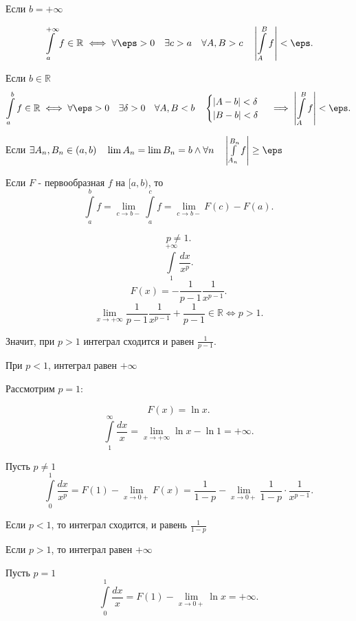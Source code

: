 \begin{remark} \thmslashn

    Если $b=+\infty$

    \[ \int\limits_{a}^{+\infty} f\in \mathbb{R} \iff \forall{\eps > 0}\quad \exists{c > a}\quad \forall{A, B > c}\quad \left| \int\limits_{A}^{B} f\right| < \eps    .\]

    Если $b\in \mathbb{R}$
    \[ \int\limits_{a}^{b} f\in \mathbb{R} \iff \forall{\eps > 0}\quad \exists{\delta > 0}\quad \forall{A, B < b}\quad \begin{cases}
        |A-b| < \delta\\
        |B-b| < \delta
    \end{cases} \implies \left| \int\limits_{A}^{B} f \right| < \eps  .\]

    Если $\exists{A_{n}, B_{n}\in (a, b)}\quad \lim A_n = \lim B_n = b \land \forall{n}\quad \left| \int\limits_{A_{n}}^{B_{n}} f\right| \ge \eps   $

    Если $F$ - первообразная $f$ на $[a, b)$, то 
    \[ \int\limits_{a}^{b} f = \lim\limits_{c \to b-} \int\limits_{a}^{c} f = \lim\limits_{c \to b-} F(c) - F(a)  .\] 
\end{remark}
\begin{example} \thmslashn
    
    \[ p \neq 1 .\] 
    \[ \int\limits_{1}^{+\infty} \frac{dx}{x^{p}}   .\]
    \[ F(x) = -\frac{1}{p-1} \frac{1}{x^{p-1}} .\]
    \[ \lim\limits_{x \to +\infty} \frac{1}{p-1} \frac{1}{x^{p-1}} + \frac{1}{p-1}\in \mathbb{R} \iff p > 1 .\]

    Значит, при $p > 1$ интеграл сходится и равен $\frac{1}{p-1}$.

    При $p < 1$, интеграл равен $+\infty$

    Рассмотрим $p=1$:

    \[ F(x) = \ln x .\]
    \[ \int\limits_{1}^{\infty} \frac{dx}{x} = \lim\limits_{x\to +\infty} \ln x - \ln 1 = +\infty  .\] 
\end{example}
\begin{example} \thmslashn

    Пусть $p \neq 1$
    \[ \int\limits_{0}^{1} \frac{dx}{x^{p}} = F(1) - \lim_{x \to 0+} F(x) = \frac{1}{1-p} - \lim\limits_{x \to 0+} \frac{1}{1-p} \cdot \frac{1}{x^{p-1}}.\]

    Если $p < 1$, то интеграл сходится, и равень $\frac{1}{1-p}$

    Если $p > 1$, то интеграл равен $+\infty$

    Пусть $p=1$
    \[ \int\limits_{0}^{1} \frac{dx}{x} = F(1) - \lim\limits_{x \to 0+} \ln x = +\infty  .\] 
\end{example}
